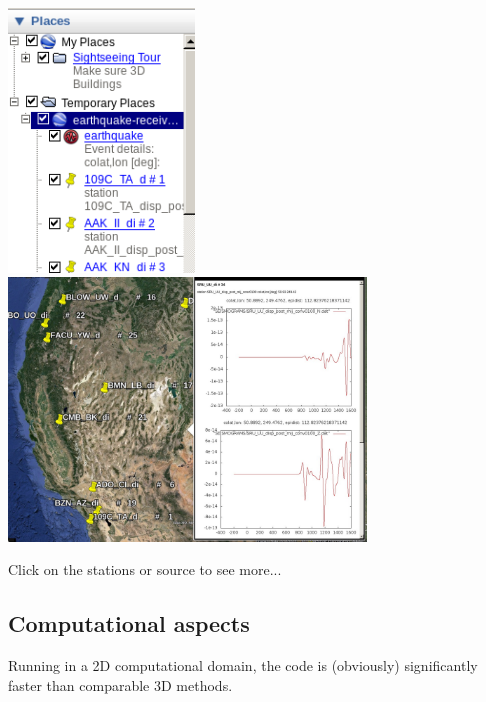 \documentclass{article}
\begin{document}
\begin{enumerate}
    \begin{center}
    \includegraphics[height=70mm]{google-earth.png}
    \hspace{5mm}
    \includegraphics[height=70mm]{google-earth2.jpg}
    \end{center}

    Click on the stations or source to see more...

\end{enumerate}

\subsection{Computational aspects}

Running in a 2D computational domain, the code is (obviously) significantly faster
than comparable 3D methods.
\end{document}

